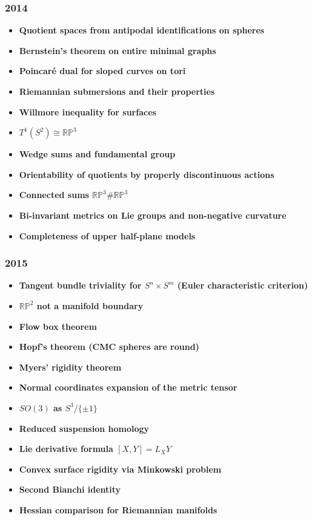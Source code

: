 \subsubsection*{2014}
\begin{itemize}
    \item \textbf{Quotient spaces from antipodal identifications on spheres}
    \item \textbf{Bernstein's theorem on entire minimal graphs}
    \item \textbf{Poincaré dual for sloped curves on tori}
    \item \textbf{Riemannian submersions and their properties}
    \item \textbf{Willmore inequality for surfaces}
    \item \textbf{$T^1(S^2) \cong \mathbb{RP}^3$}
    \item \textbf{Wedge sums and fundamental group}
    \item \textbf{Orientability of quotients by properly discontinuous actions}
    \item \textbf{Connected sums $\mathbb{RP}^3 \# \mathbb{RP}^3$}
    \item \textbf{Bi-invariant metrics on Lie groups and non-negative curvature}
    \item \textbf{Completeness of upper half-plane models}
\end{itemize}

\subsubsection*{2015}
\begin{itemize}
    \item \textbf{Tangent bundle triviality for $S^n \times S^m$ (Euler characteristic criterion)}
    \item \textbf{$\mathbb{RP}^2$ not a manifold boundary}
    \item \textbf{Flow box theorem}
    \item \textbf{Hopf's theorem (CMC spheres are round)}
    \item \textbf{Myers' rigidity theorem}
    \item \textbf{Normal coordinates expansion of the metric tensor}
    \item \textbf{$SO(3)$ as $S^3/\{\pm 1\}$}
    \item \textbf{Reduced suspension homology}
    \item \textbf{Lie derivative formula $[X,Y] = L_X Y$}
    \item \textbf{Convex surface rigidity via Minkowski problem}
    \item \textbf{Second Bianchi identity}
    \item \textbf{Hessian comparison for Riemannian manifolds}
\end{itemize}

